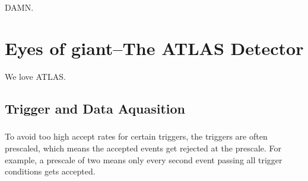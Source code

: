 \begin{savequote}[75mm]
DAMN.
\end{savequote}

\chapter{Eyes of giant--The ATLAS Detector}

We love ATLAS.

\section{Trigger and Data Aquasition}
\paragraph{}
To avoid too high accept rates for certain triggers, the triggers are often prescaled, which means the accepted events get rejected at the prescale. For example, a prescale of two means only every second event passing all trigger conditions gets accepted. 